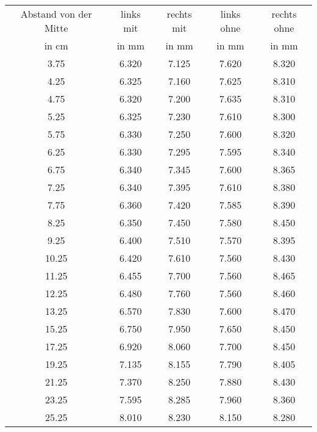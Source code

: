 \begin{tabular}{c | c | c | c | c}
	Abstand von der Mitte & links mit & rechts mit & links ohne & rechts ohne \\
	in cm & in mm & in mm & in mm & in mm \\
	\hline
	3.75 & 6.320 & 7.125 & 7.620 & 8.320 \\
	4.25 & 6.325 & 7.160 & 7.625 & 8.310 \\
	4.75 & 6.320 & 7.200 & 7.635 & 8.310 \\
	5.25 & 6.325 & 7.230 & 7.610 & 8.300 \\
	5.75 & 6.330 & 7.250 & 7.600 & 8.320 \\
	6.25 & 6.330 & 7.295 & 7.595 & 8.340 \\
	6.75 & 6.340 & 7.345 & 7.600 & 8.365 \\
	7.25 & 6.340 & 7.395 & 7.610 & 8.380 \\
	7.75 & 6.360 & 7.420 & 7.585 & 8.390 \\
	8.25 & 6.350 & 7.450 & 7.580 & 8.450 \\
	9.25 & 6.400 & 7.510 & 7.570 & 8.395 \\
	10.25 & 6.420 & 7.610 & 7.560 & 8.430 \\
	11.25 & 6.455 & 7.700 & 7.560 & 8.465 \\
	12.25 & 6.480 & 7.760 & 7.560 & 8.460 \\
	13.25 & 6.570 & 7.830 & 7.600 & 8.470 \\
	15.25 & 6.750 & 7.950 & 7.650 & 8.450 \\
	17.25 & 6.920 & 8.060 & 7.700 & 8.450 \\
	19.25 & 7.135 & 8.155 & 7.790 & 8.405 \\
	21.25 & 7.370 & 8.250 & 7.880 & 8.430 \\
	23.25 & 7.595 & 8.285 & 7.960 & 8.360 \\
	25.25 & 8.010 & 8.230 & 8.150 & 8.280 \\
\end{tabular}